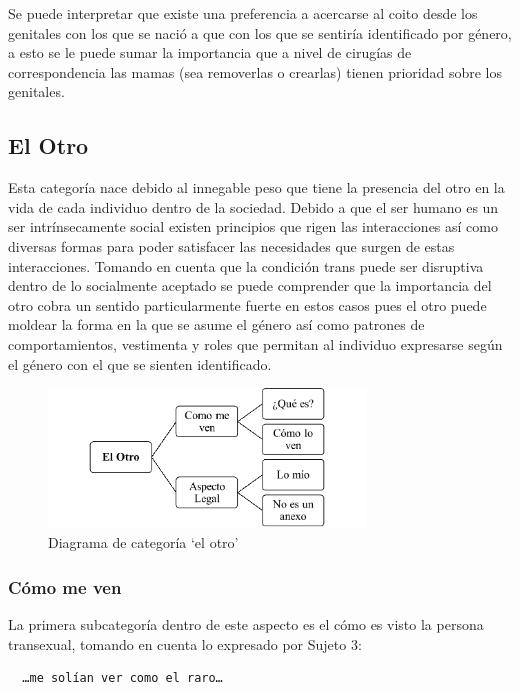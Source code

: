 Se puede interpretar que existe una preferencia a acercarse al coito desde los
genitales con los que se nació a que con los que se sentiría identificado por
género, a esto se le puede sumar la importancia que a nivel de cirugías de
correspondencia las mamas (sea removerlas o crearlas) tienen prioridad sobre los
genitales.

\subsection{El Otro}

Esta categoría nace debido al innegable peso que tiene la presencia del otro en
la vida de cada individuo dentro de la sociedad. Debido a que el ser humano es
un ser intrínsecamente social existen principios que rigen las interacciones así
como diversas formas para poder satisfacer las necesidades que surgen de estas
interacciones. Tomando en cuenta que la condición trans puede ser disruptiva
dentro de lo socialmente aceptado se puede comprender que la importancia del
otro cobra un sentido particularmente fuerte en estos casos pues el otro puede
moldear la forma en la que se asume el género así como patrones de
comportamientos, vestimenta y roles que permitan al individuo expresarse según
el género con el que se sienten identificado.

\begin{figure}
    \centering
    \includegraphics[width=0.75\textwidth]{otro}
    \caption{Diagrama de categoría ‘el otro’}\label{fig:otro}
\end{figure}

\subsubsection{Cómo me ven}

La primera subcategoría dentro de este aspecto es el cómo es visto la persona
transexual, tomando en cuenta lo expresado por Sujeto 3:

\begin{verbatim}
  …me solían ver como el raro…
\end{verbatim}

